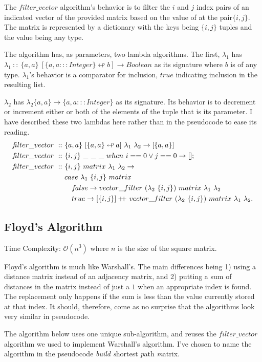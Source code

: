 \documentclass[a4paper,10pt]{book}
\newcommand\when{\  when\ }
\newcommand\doubleplus{+\kern-1.3ex+\kern0.8ex}
\newcommand{\false}{f\kern-0.25ex{alse}}
\newcommand\f{\textit{f}}
\begin{document}
The $\f ilter\_vector$ algorithm's behavior is to filter the $i$ and $j$ index pairs of an indicated vector of the provided matrix based on the value of at the pair$\{i,j\}$. The matrix is represented by a dictionary with the keys being $\{i,j\}$ tuples and the value being any type.

The algorithm has, as parameters, two lambda algorithms. The first, $\lambda_1$ has $\lambda_1\ ::\ \{a,a\}\ [\{a,a:::Integer\}\looparrowleft b]\rightarrow Boolean$ as its signature where $b$ is of any type. $\lambda_1$'s behavior is a comparator for inclusion, $true$ indicating inclusion in the resulting list.

$\lambda_2$ has $\lambda_2\{a,a\}\rightarrow\{a,a:::Integer\}$ as its signature. Its behavior is to decrement or increment either or both of the elements of the tuple that is its parameter. I have described these two lambdas here rather than in the pseudocode to ease its reading.
\begin{align*}
\f ilter\_vector\ ::\ &\{a,a\}\ [\{a,a\}\looparrowleft a]\ \lambda_1\ \lambda_2\rightarrow [\{a,a\}]\\
\f ilter\_vector\ ::\ &\{i,j\}\ \_\ \_\ \_\when i==0 \lor j==0\rightarrow [];\\
\f ilter\_vector\ ::\ &\{i,j\}\ matrix\ \lambda_1\ \lambda_2\rightarrow\\
	&case\ \lambda_1\ \{i,j\}\ matrix\\
	&\quad \false\rightarrow vector\_filter\ (\lambda_2\ \{i,j\})\ matrix\ \lambda_1\ \lambda_2\\
	&\quad true\rightarrow [\{i,j\}]\doubleplus vector\_filter\ (\lambda_2\ \{i,j\})\ matrix\ \lambda_1\ \lambda_2.
\end{align*}

\subsection{Floyd's Algorithm}
Time Complexity: $\mathcal{O}(n^3)$ where $n$ is the size of the square matrix.

Floyd's algorithm is much like Warshall's. The main differences being 1) using a distance matrix instead of an adjacency matrix, and 2) putting a sum of distances in the matrix instead of just a $1$ when an appropriate index is found. The replacement only happens if the sum is less than the value currently stored at that index. It should, therefore, come as no surprise that the algorithms look very similar in pseudocode.

The algorithm below uses one unique sub-algorithm, and reuses the $\f ilter\_vector$ algorithm we used to implement Warshall's algorithm. I've chosen to name the algorithm in the pseudocode \textit{build s}hortest \textit{p}ath \textit{m}atrix.
\end{document}

